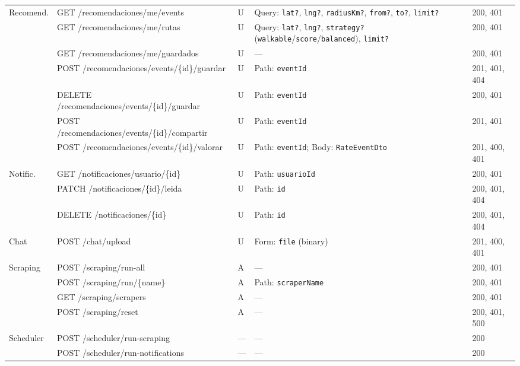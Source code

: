 \begin{longtable}{|p{1.5cm}|p{3.6cm}|p{0.8cm}|p{4cm}|p{2.8cm}|}
\multirow{7}{=}{Recomend.}
 & GET /recomendaciones/me/events & U & Query: \texttt{lat?}, \texttt{lng?}, \texttt{radiusKm?}, \texttt{from?}, \texttt{to?}, \texttt{limit?} & 200, 401 \\
\cline{2-5}
 & GET /recomendaciones/me/rutas & U & Query: \texttt{lat?}, \texttt{lng?}, \texttt{strategy?} (\texttt{walkable}/\texttt{score}/\texttt{balanced}), \texttt{limit?} & 200, 401 \\
\cline{2-5}
 & GET /recomendaciones/me/guardados & U & — & 200, 401 \\
\cline{2-5}
 & POST /recomendaciones/events/\{id\}/guardar & U & Path: \texttt{eventId} & 201, 401, 404 \\
\cline{2-5}
 & DELETE /recomendaciones/events/\{id\}/guardar & U & Path: \texttt{eventId} & 200, 401 \\
\cline{2-5}
 & POST /recomendaciones/events/\{id\}/compartir & U & Path: \texttt{eventId} & 201, 401 \\
\cline{2-5}
 & POST /recomendaciones/events/\{id\}/valorar & U & Path: \texttt{eventId}; Body: \texttt{RateEventDto} & 201, 400, 401 \\
\hline

\multirow{3}{=}{Notific.}
 & GET /notificaciones/usuario/\{id\} & U & Path: \texttt{usuarioId} & 200, 401 \\
\cline{2-5}
 & PATCH /notificaciones/\{id\}/leida & U & Path: \texttt{id} & 200, 401, 404 \\
\cline{2-5}
 & DELETE /notificaciones/\{id\} & U & Path: \texttt{id} & 200, 401, 404 \\
\hline

Chat & POST /chat/upload & U & Form: \texttt{file} (binary) & 201, 400, 401 \\
\hline

\multirow{4}{=}{Scraping}
 & POST /scraping/run-all & A & — & 200, 401 \\
\cline{2-5}
 & POST /scraping/run/\{name\} & A & Path: \texttt{scraperName} & 200, 401 \\
\cline{2-5}
 & GET /scraping/scrapers & A & — & 200, 401 \\
\cline{2-5}
 & POST /scraping/reset & A & — & 200, 401, 500 \\
\hline

\multirow{2}{=}{Scheduler}
 & POST /scheduler/run-scraping & — & — & 200 \\
\cline{2-5}
 & POST /scheduler/run-notifications & — & — & 200 \\
\hline

\end{longtable}

